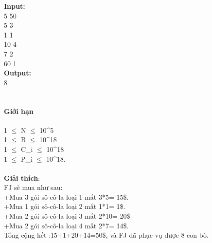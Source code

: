 \textbf{Input:}
\\5 50
\\5 3
\\1 1
\\10 4
\\7 2
\\60 1
\\\textbf{Output:}
\\8
\\
\\
\\\textbf{​Giới hạn}
\\
\\1 $\le$ N $\le$ 10^5
\\1  $\le$  B  $\le$  10^18
\\1  $\le$  C\_i  $\le$  10^18
\\1  $\le$  P\_i  $\le$  10^18.
\\
\\\textbf{Giải thích}:
\\FJ sẽ mua như sau:
\\+Mua 3 gói sô-cô-la loại 1 mất 3*5= 15\$.
\\+Mua 1 gói sô-cô-la loại 2 mất 1*1= 1\$.
\\+Mua 2 gói sô-cô-la loại 3 mất 2*10= 20\$
\\+Mua 2 gói sô-cô-la loại 4 mất 2*7= 14\$.
\\Tổng cộng hết :15+1+20+14=50\$, và FJ đã phục vụ được 8 con bò.

 

 